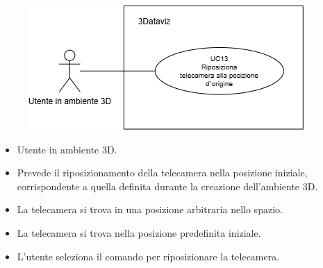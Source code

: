 \begin{figure}[H]\centering
    \includegraphics[scale=0.7]{template/images/UC13.png}
    \caption{}
\end{figure}
\UCdsc
{ %
    \begin{itemize}
        \item Utente in ambiente 3D.
    \end{itemize}
}
{ %
    \begin{itemize}
        \item Prevede il riposizionamento della telecamera nella posizione iniziale, corrispondente a quella definita durante la creazione dell'ambiente 3D.
    \end{itemize}
}
{ %
    \begin{itemize}
        \item La telecamera si trova in una posizione arbitraria nello spazio.
    \end{itemize}
}
{ %
    \begin{itemize}
        \item La telecamera si trova nella posizione predefinita iniziale.
    \end{itemize}
}
{ %
    \begin{itemize}
        \item L'utente seleziona il comando per riposizionare la telecamera.
    \end{itemize}
} 



